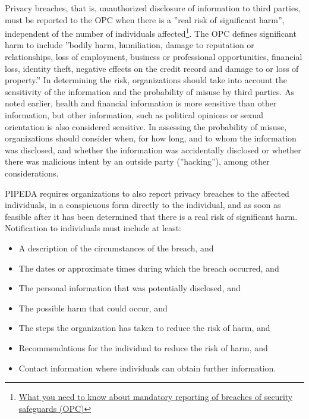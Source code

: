Privacy breaches, that is, unauthorized disclosure of information to third parties, must be reported to the OPC when there is a ''real risk of significant harm'', independent of the number of individuals affected\footnote{\href{https://www.priv.gc.ca/en/privacy-topics/business-privacy/safeguards-and-breaches/privacy-breaches/respond-to-a-privacy-breach-at-your-business/gd_pb_201810/}{What you need to know about mandatory reporting of breaches of security safeguards (OPC)}}. The OPC defines significant harm to include ''bodily harm, humiliation, damage to reputation or relationships, loss of employment, business or professional opportunities, financial loss, identity theft, negative effects on the credit record and damage to or loss of property.'' In determining the risk, organizations should take into account the sensitivity of the information and the probability of misuse by third parties. As noted earlier, health and financial information is more sensitive than other information, but other information, such as political opinions or sexual orientation is also considered sensitive. In assessing the probability of misuse, organizations should consider when, for how long, and to whom the information was disclosed, and whether the information was accidentally disclosed or whether there was malicious intent by an outside party (''hacking''), among other considerations.

PIPEDA requires organizations to also report privacy breaches to the affected individuals, in a conspicuous form directly to the individual, and as soon as feasible after it has been determined that there is a real risk of significant harm. Notification to individuals must include at least:
\begin{itemize}
\item A description of the circumstances of the breach, and
\item The dates or approximate times during which the breach occurred, and
\item The personal information that was potentially disclosed, and
\item The possible harm that could occur, and
\item The steps the organization has taken to reduce the risk of harm, and
\item Recommendations for the individual to reduce the risk of harm, and
\item Contact information where individuals can obtain further information.
\end{itemize}

